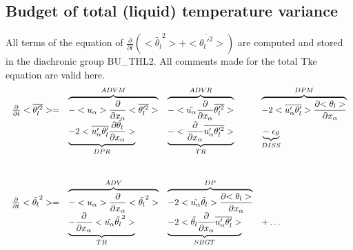 \subsection{Budget of total (liquid) temperature variance}


All terms of the equation of $\frac{\partial}{\partial t} (<\tilde{\theta_l}^2> + <\overline{\theta_l'^2}>)$ are
computed and stored in the diachronic group BU\_THL2. 
All comments made for the total Tke equation are valid here.\\

\begin{displaymath}
\left.
\begin{array}{rllll}
\frac{\partial }{\partial t} <\overline{\theta_l'^2}> = & 
\overbrace{- <u_\alpha>\frac{\partial}{\partial x_\alpha} <\overline{\theta_l'^2}> }^{ADVM}  &
\overbrace{- <\tilde{u_\alpha}\frac{\partial}{\partial x_\alpha} \overline{\theta_l'^2} > }^{ADVR} &
\overbrace{- 2 <\overline{u_\alpha'\theta_l'}> \frac{\partial {<\theta_l>}}{\partial x_\alpha} }^{DPM} \\
\vspace*{1.0cm}
& \underbrace{- 2 <\overline{u'_\alpha \theta_l'} \frac{\partial {\tilde{\theta_l}}}{\partial x_\alpha}>}_{DPR}  &
 \underbrace{- <\frac{\partial}{\partial x_\alpha} \overline{u'_\alpha \theta_l'^2}>}_{TR}
 & \underbrace{-\; \epsilon_{\theta}}_{DISS}\\
\frac{\partial }{\partial t} <\tilde{\theta_l}^2> = & 
\overbrace{- <u_\alpha>\frac{\partial}{\partial x_\alpha} <\tilde{\theta_l}^2> }^{ADV} &
\overbrace{- 2<\tilde{u_\alpha} \tilde{\theta_l}> \frac{\partial {<\theta_l>}}{\partial x_\alpha}}^{DP} &\\
& \underbrace{- \frac{\partial}{\partial x_\alpha} <\tilde{u_\alpha} \tilde{\theta_l}^2>}_{TR} &
\underbrace{- 2 <\tilde{\theta_l}\frac{\partial}{\partial x_\alpha}\overline{u'_\alpha \theta_l'}>}_{SBGT} & + \ldots
\end{array}
\right.
\end{displaymath}

